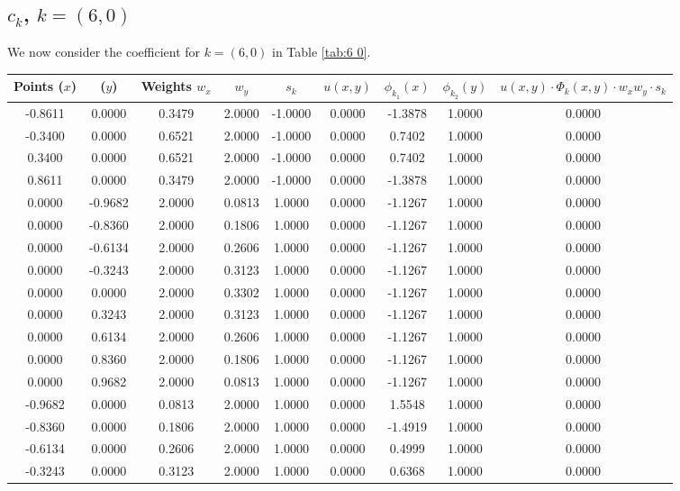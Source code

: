 \documentclass[11pt]{article}
\begin{document}
\newpage
\subsection{$c_k$, $k=(6,0)$}
We now consider the coefficient for $k=(6,0)$ in Table \ref{tab:6 0}.  
\begin{longtable}{c c|c c|c|c|c c|c}
Points ($x$) & ($y$) & Weights $w_x$ & $w_y$ & $s_k$ & $u(x,y)$ & $\phi_{k_1}(x)$ & $\phi_{k_2}(y)$ &
     $u(x,y)\cdot\Phi_k(x,y)\cdot w_xw_y\cdot s_k$\\ \hline
-0.8611 & 0.0000 & 0.3479 & 2.0000 & -1.0000 & 0.0000 & -1.3878 & 1.0000 & 0.0000 \\
-0.3400 & 0.0000 & 0.6521 & 2.0000 & -1.0000 & 0.0000 & 0.7402 & 1.0000 & 0.0000 \\
0.3400 & 0.0000 & 0.6521 & 2.0000 & -1.0000 & 0.0000 & 0.7402 & 1.0000 & 0.0000 \\
0.8611 & 0.0000 & 0.3479 & 2.0000 & -1.0000 & 0.0000 & -1.3878 & 1.0000 & 0.0000 \\
0.0000 & -0.9682 & 2.0000 & 0.0813 & 1.0000 & 0.0000 & -1.1267 & 1.0000 & 0.0000 \\
0.0000 & -0.8360 & 2.0000 & 0.1806 & 1.0000 & 0.0000 & -1.1267 & 1.0000 & 0.0000 \\
0.0000 & -0.6134 & 2.0000 & 0.2606 & 1.0000 & 0.0000 & -1.1267 & 1.0000 & 0.0000 \\
0.0000 & -0.3243 & 2.0000 & 0.3123 & 1.0000 & 0.0000 & -1.1267 & 1.0000 & 0.0000 \\
0.0000 & 0.0000 & 2.0000 & 0.3302 & 1.0000 & 0.0000 & -1.1267 & 1.0000 & 0.0000 \\
0.0000 & 0.3243 & 2.0000 & 0.3123 & 1.0000 & 0.0000 & -1.1267 & 1.0000 & 0.0000 \\
0.0000 & 0.6134 & 2.0000 & 0.2606 & 1.0000 & 0.0000 & -1.1267 & 1.0000 & 0.0000 \\
0.0000 & 0.8360 & 2.0000 & 0.1806 & 1.0000 & 0.0000 & -1.1267 & 1.0000 & 0.0000 \\
0.0000 & 0.9682 & 2.0000 & 0.0813 & 1.0000 & 0.0000 & -1.1267 & 1.0000 & 0.0000 \\
-0.9682 & 0.0000 & 0.0813 & 2.0000 & 1.0000 & 0.0000 & 1.5548 & 1.0000 & 0.0000 \\
-0.8360 & 0.0000 & 0.1806 & 2.0000 & 1.0000 & 0.0000 & -1.4919 & 1.0000 & 0.0000 \\
-0.6134 & 0.0000 & 0.2606 & 2.0000 & 1.0000 & 0.0000 & 0.4999 & 1.0000 & 0.0000 \\
-0.3243 & 0.0000 & 0.3123 & 2.0000 & 1.0000 & 0.0000 & 0.6368 & 1.0000 & 0.0000 \\

\end{longtable}
\end{document}
